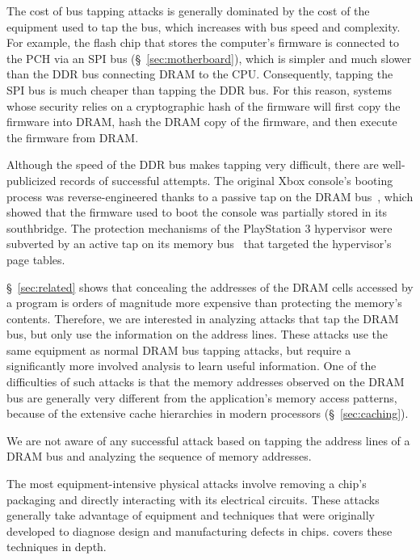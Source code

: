 The cost of bus tapping attacks is generally dominated by the cost of the
equipment used to tap the bus, which increases with bus speed and complexity.
For example, the flash chip that stores the computer's firmware is connected to
the PCH via an SPI bus (\S~\ref{sec:motherboard}), which is simpler and much
slower than the DDR bus connecting DRAM to the CPU. Consequently, tapping the
SPI bus is much cheaper than tapping the DDR bus. For this reason, systems
whose security relies on a cryptographic hash of the firmware will first copy
the firmware into DRAM, hash the DRAM copy of the firmware, and then execute
the firmware from DRAM.

Although the speed of the DDR bus makes tapping very difficult, there are
well-publicized records of successful attempts. The original Xbox console's
booting process was reverse-engineered thanks to a passive tap on the DRAM
bus~\cite{huang2003xbox}, which showed that the firmware used to boot the
console was partially stored in its southbridge. The protection mechanisms of
the PlayStation 3 hypervisor were subverted by an active tap on its memory
bus~\cite{hotz2010ps3} that targeted the hypervisor's page tables.

\S~\ref{sec:related} shows that concealing the addresses of the DRAM cells
accessed by a program is orders of magnitude more expensive than protecting the
memory's contents. Therefore, we are interested in analyzing attacks that tap
the DRAM bus, but only use the information on the address lines. These attacks
use the same equipment as normal DRAM bus tapping attacks, but require a
significantly more involved analysis to learn useful information. One of the
difficulties of such attacks is that the memory addresses observed on the DRAM
bus are generally very different from the application's memory access patterns,
because of the extensive cache hierarchies in modern processors
(\S~\ref{sec:caching}).

We are not aware of any successful attack based on tapping the address lines of
a DRAM bus and analyzing the sequence of memory addresses.


\label{sec:physical_chip_attacks}

The most equipment-intensive physical attacks involve removing a chip's
packaging and directly interacting with its electrical circuits. These attacks
generally take advantage of equipment and techniques that were originally
developed to diagnose design and manufacturing defects in chips.
\cite{beck1998integrated} covers these techniques in depth.

